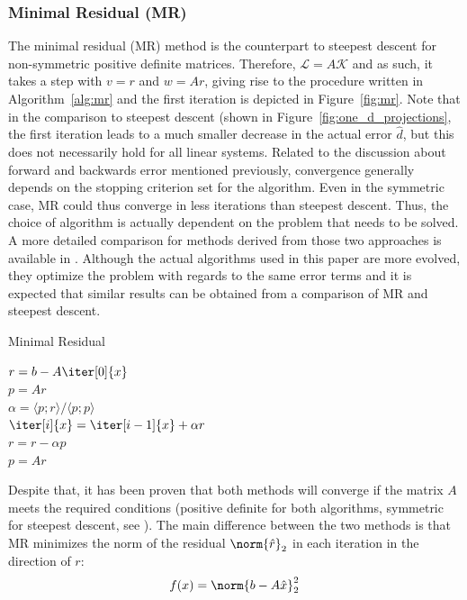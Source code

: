 \subsubsection{Minimal Residual (MR)}
\label{sec:mr}
The minimal residual (MR) method is the counterpart to steepest descent for non-symmetric positive definite matrices. Therefore, $\mathcal{L}=A\mathcal{K}$ and as such, it takes a step with $v=r$ and $w=Ar$, giving rise to the procedure written in Algorithm~\hyperref[alg:mr]{\ref{alg:mr}} and the first iteration is depicted in Figure~\hyperref[fig:mr]{\ref{fig:mr}}. Note that in the comparison to steepest descent (shown in Figure~\hyperref[fig:one_d_projections]{\ref{fig:one_d_projections}}, the first iteration leads to a much smaller decrease in the actual error $\hat{d}$, but this does not necessarily hold for all linear systems. Related to the discussion about forward and backwards error mentioned previously, convergence generally depends on the stopping criterion set for the algorithm. Even in the symmetric case, MR could thus converge in less iterations than steepest descent. Thus, the choice of algorithm is actually dependent on the problem that needs to be solved. A more detailed comparison for methods derived from those two approaches is available in \cite{chin_cg_2012}. Although the actual algorithms used in this paper are more evolved, they optimize the problem with regards to the same error terms and it is expected that similar results can be obtained from a comparison of MR and steepest descent.
 

\begin{algorithm}[h]
  \caption{Minimal Residual}
  \label{alg:mr}
  \SetAlgoLined
  \DontPrintSemicolon
  $r = b-A\iter[0]{x}$ \\
  $p = Ar$ \\
   {
    $\alpha = \langle p;r \rangle / \langle p;p \rangle$ \\
    $\iter[i]{x} = \iter[i-1]{x}+\alpha r$ \\
    $r = r - \alpha p$ \\
    $p = Ar$ \\
  }
\end{algorithm}

Despite that, it has been proven that both methods will converge if the matrix $A$ meets the required conditions (positive definite for both algorithms, symmetric for steepest descent, see \cite{saad_iterative_2003}). The main difference between the two methods is that MR minimizes the norm of the residual $\norm{\hat{r}}_2$ in each iteration in the direction of $r$:
\begin{equation}
    f(x) = \norm{b-A\hat{x}}_2^2    
\end{equation}

